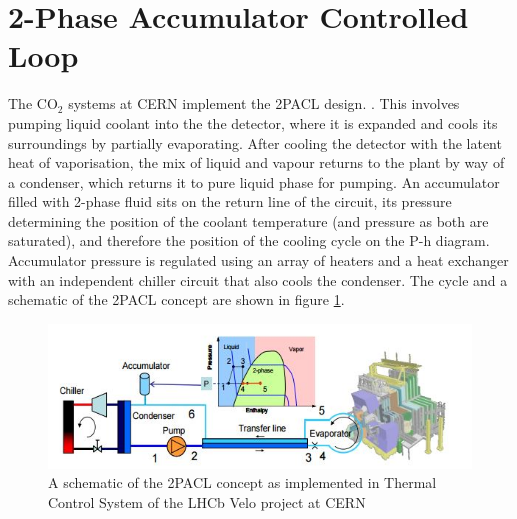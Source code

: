 \documentclass{report}
\begin{document}
\section{2-Phase Accumulator Controlled Loop}
The CO$_2$ systems at CERN implement the 2PACL design. \cite{Daguin 2012}. This involves pumping liquid coolant into the the detector, where it is expanded and cools its surroundings by partially evaporating. After cooling the detector with the latent heat of vaporisation, the mix of liquid and vapour returns to the plant by way of a condenser, which returns it to pure liquid phase for pumping. An accumulator filled with 2-phase fluid sits on the return line of the circuit, its pressure determining the position of the coolant temperature (and pressure as both are saturated), and therefore the position of the cooling cycle on the P-h diagram. Accumulator pressure is regulated using an array of heaters and a heat exchanger with an independent chiller circuit that also cools the condenser. The cycle and a schematic of the 2PACL concept are shown in figure \ref{fig:2PACL}.
\begin{figure}[h!]
\includegraphics{2PACLschem}
\caption{A schematic of the 2PACL concept as implemented in Thermal Control System of the LHCb Velo project at CERN \cite{CO2 PoS}}
\label{fig:2PACL}
\end{figure}
\end{document}
